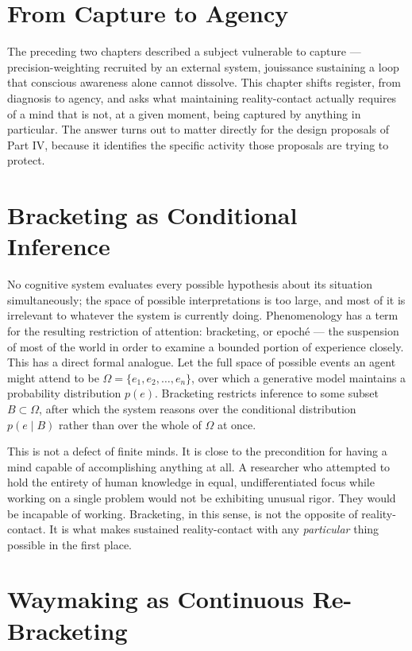 \documentclass[12pt,a4paper]{book}
\begin{document}
\section{From Capture to Agency}

The preceding two chapters described a subject vulnerable to capture — precision-weighting recruited by an external system, jouissance sustaining a loop that conscious awareness alone cannot dissolve. This chapter shifts register, from diagnosis to agency, and asks what maintaining reality-contact actually requires of a mind that is not, at a given moment, being captured by anything in particular. The answer turns out to matter directly for the design proposals of Part IV, because it identifies the specific activity those proposals are trying to protect.

\section{Bracketing as Conditional Inference}

No cognitive system evaluates every possible hypothesis about its situation simultaneously; the space of possible interpretations is too large, and most of it is irrelevant to whatever the system is currently doing. Phenomenology has a term for the resulting restriction of attention: bracketing, or epoché — the suspension of most of the world in order to examine a bounded portion of experience closely. This has a direct formal analogue. Let the full space of possible events an agent might attend to be $\Omega = \{e_1, e_2, \ldots, e_n\}$, over which a generative model maintains a probability distribution $p(e)$. Bracketing restricts inference to some subset $B \subset \Omega$, after which the system reasons over the conditional distribution $p(e \mid B)$ rather than over the whole of $\Omega$ at once.

This is not a defect of finite minds. It is close to the precondition for having a mind capable of accomplishing anything at all. A researcher who attempted to hold the entirety of human knowledge in equal, undifferentiated focus while working on a single problem would not be exhibiting unusual rigor. They would be incapable of working. Bracketing, in this sense, is not the opposite of reality-contact. It is what makes sustained reality-contact with any \emph{particular} thing possible in the first place.

\section{Waymaking as Continuous Re-Bracketing}
\end{document}
